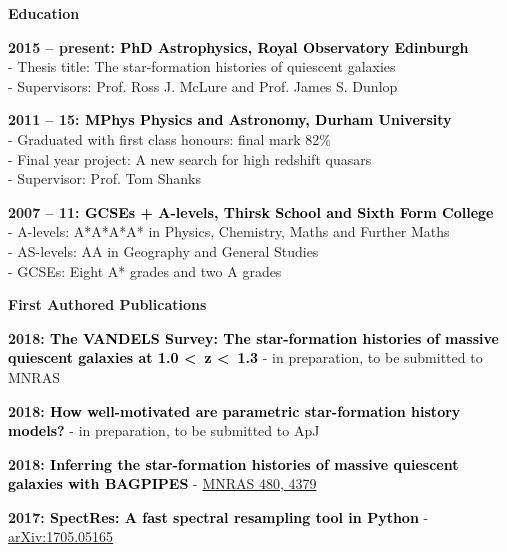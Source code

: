 \documentclass[a4paper,11pt,final]{memoir}
\newcommand{\Sep}{\vspace{1.5em}}
\newcommand{\SmallSep}{\vspace{0.5em}}
\newcommand{\CVSection}[1]
	{\Large\textbf{#1}\par
	\SmallSep\normalsize\normalfont}
\newcommand{\CVItem}[1]
	{\textbf{\color{RoyalBlue} #1}}
\begin{document}
\Sep

\CVSection{Education}
\CVItem{2015 -- present: \textcolor{black}{PhD Astrophysics, Royal Observatory Edinburgh}}\\
 - Thesis title: The star-formation histories of quiescent galaxies \\
 - Supervisors: Prof. Ross J. McLure and Prof. James S. Dunlop
 
 \SmallSep

\CVItem{2011 -- 15: \textcolor{black}{MPhys Physics and Astronomy, Durham University}}\\
 - Graduated with first class honours: final mark 82\%\\
 - Final year project: A new search for high redshift quasars\\
 - Supervisor: Prof. Tom Shanks
 
 \SmallSep
 
\CVItem{2007 -- 11: \textcolor{black}{GCSEs + A-levels, Thirsk School and Sixth Form College}}\\
 - A-levels: A*A*A*A* in Physics, Chemistry, Maths and Further Maths\\
 - AS-levels: AA in Geography and General Studies\\
 - GCSEs: Eight A* grades and two A grades
 
\Sep

\CVSection{First Authored Publications}

\textbf{\color{RoyalBlue}2018: \textcolor{black}{The VANDELS Survey: The star-formation histories of massive quiescent galaxies at 1.0 \textless\ z \textless\ 1.3}} - in preparation, to be submitted to MNRAS

\SmallSep

\textbf{\color{RoyalBlue}2018: \textcolor{black}{How well-motivated are parametric star-formation history models?}} - in preparation, to be submitted to ApJ

\SmallSep

\textbf{\color{RoyalBlue}2018: \textcolor{black}{Inferring the star-formation histories of massive quiescent galaxies with BAGPIPES}} - {\color{RoyalBlue}\href{https://academic.oup.com/mnras/article-abstract/480/4/4379/5068189}{MNRAS 480, 4379}}

\SmallSep

\textbf{\color{RoyalBlue}2017: \textcolor{black}{SpectRes: A fast spectral resampling tool in Python}} - {\color{RoyalBlue}\href{https://arxiv.org/abs/1705.05165}{arXiv:1705.05165}}

\SmallSep
\end{document}
